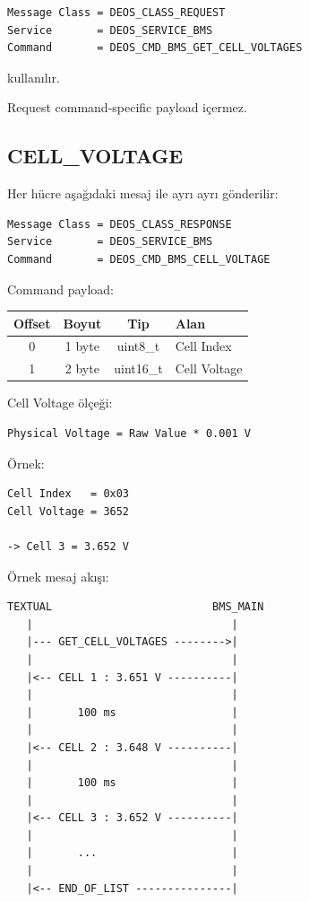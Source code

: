 \documentclass[a4paper,10pt]{article}
\begin{document}
\begin{lstlisting}
Message Class = DEOS_CLASS_REQUEST
Service       = DEOS_SERVICE_BMS
Command       = DEOS_CMD_BMS_GET_CELL_VOLTAGES
\end{lstlisting}

kullanılır.

Request command-specific payload içermez.

\subsection{CELL\_VOLTAGE}

Her hücre aşağıdaki mesaj ile ayrı ayrı gönderilir:

\begin{lstlisting}
Message Class = DEOS_CLASS_RESPONSE
Service       = DEOS_SERVICE_BMS
Command       = DEOS_CMD_BMS_CELL_VOLTAGE
\end{lstlisting}

Command payload:

\begin{center}
\begin{tabular}{c c c l}
\toprule
\textbf{Offset} &
\textbf{Boyut} &
\textbf{Tip} &
\textbf{Alan} \\
\midrule

0 & 1 byte & uint8\_t  & Cell Index \\
1 & 2 byte & uint16\_t & Cell Voltage \\

\bottomrule
\end{tabular}
\end{center}

Cell Voltage ölçeği:

\begin{lstlisting}
Physical Voltage = Raw Value * 0.001 V
\end{lstlisting}

Örnek:

\begin{lstlisting}
Cell Index   = 0x03
Cell Voltage = 3652

-> Cell 3 = 3.652 V
\end{lstlisting}

Örnek mesaj akışı:

\begin{lstlisting}
TEXTUAL                         BMS_MAIN
   |                               |
   |--- GET_CELL_VOLTAGES -------->|
   |                               |
   |<-- CELL 1 : 3.651 V ----------|
   |                               |
   |       100 ms                  |
   |                               |
   |<-- CELL 2 : 3.648 V ----------|
   |                               |
   |       100 ms                  |
   |                               |
   |<-- CELL 3 : 3.652 V ----------|
   |                               |
   |       ...                     |
   |                               |
   |<-- END_OF_LIST ---------------|
\end{lstlisting}
\end{document}

